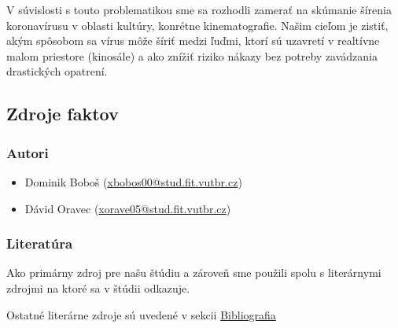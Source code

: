 \documentclass[a4paper, 11pt]{article}
\begin{document}
	\par V súvislosti s touto problematikou sme sa rozhodli zamerať na skúmanie šírenia koronavírusu v oblasti kultúry, konrétne kinematografie. Našim cieľom je zistiť, akým spôsobom sa vírus môže šíriť medzi ľuďmi, ktorí sú uzavretí v realtívne malom priestore (kinosále) a ako znížiť riziko nákazy bez potreby zavádzania drastických opatrení.
	
	\subsection{Zdroje faktov}
	    \subsubsection{Autori}
	    \begin{itemize}
	        \item Dominik Boboš (\href{mailto:xbobos00@stud.fit.vutbr.cz}{xbobos00@stud.fit.vutbr.cz})
	        \item Dávid Oravec (\href{mailto:xorave05@stud.fit.vutbr.cz}{xorave05@stud.fit.vutbr.cz})
	    \end{itemize}
	    
	    \subsubsection{Literatúra}
	    Ako primárny zdroj pre našu štúdiu a zároveň  sme použili \cite{maxbrenner2020} spolu s literárnymi zdrojmi na ktoré sa v štúdii odkazuje.
	    
	    Ostatné literárne zdroje sú uvedené v sekcii \hyperref[sec:bib]{Bibliografia}
	
	
	\newpage
    
    \renewcommand{\refname}{Bibliografia}
    \label{sec:bib}
    
\end{document}
